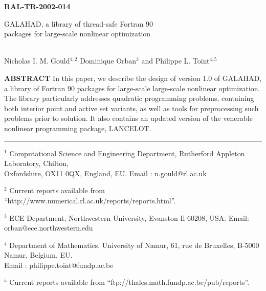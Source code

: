\documentclass[twoside]{article}
\title{\papertitle}
\author{\paperauthor}
\newcommand{\gal}{{\sf GALAHAD}}
\newcommand{\lan}{{\sf LANCELOT}}
\newcommand{\theabstract}{In this paper, we describe the
design of version 1.0 of \gal, a library of Fortran 90 packages for 
large-scale large-scale nonlinear optimization.
The library particularly addresses quadratic programming problems,
containing both interior point and active set variants, as well as
tools for preprocessing such problems prior to solution.
It also contains an updated version of the venerable nonlinear
programming package, \lan.}
\begin{document}
%


\begin{titlepage}

\begin{flushright} {\large \bf RAL-TR-2002-014} \end{flushright}           
\vspace*{0.2 cm}

{\LARGE \bf
\begin{center}
\gal, a library of thread-safe Fortran 90 \\
packages for large-scale nonlinear optimization
\end{center}}
\vspace*{0.1 cm}
\begin{center}
\mbox{} \\
      Nicholas I. M. Gould$^{1,2}$
      Dominique Orban$^{3}$
      and
      Philippe L. Toint$^{4,5}$
\\
\end{center}

\vspace{0.4cm}

\begin{center}
\parbox{\textwidth}{
{
{\bf  ABSTRACT \newline}
\theabstract}
}
\end{center}

\vspace{0.2 cm}

\noindent \rule{\textwidth}{0.001in}
\vspace{0.1 cm}

{\small
\begin{description}
\item  $^1$ Computational Science and Engineering Department,
       Rutherford Appleton Laboratory, 
       Chilton, \\ Oxfordshire, OX11 0QX, England, EU. 
       Email : n.gould@rl.ac.uk
\item  $^2$ Current reports available from %
       ``http://www.numerical.rl.ac.uk/reports/reports.html''.
\item $^3$ ECE Department,  Northwestern University, Evanston Il 60208, USA. 
       Email: orban@ece.northwestern.edu
\item  $^4$ Department of Mathematics, University of Namur, 
       61, rue de Bruxelles, B-5000 Namur, Belgium, EU. \\
       Email : philippe.toint@fundp.ac.be
\item  $^5$ Current reports available from %
       ``ftp://thales.math.fundp.ac.be/pub/reports''.
\end{description}
}


\end{titlepage}
\end{document}
